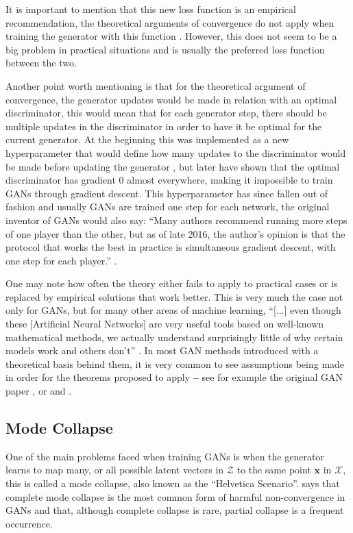 It is important to mention that this new loss function is an empirical recommendation, the theoretical arguments of convergence do not apply when training the generator with this function \cite{gans2014}. However, this does not seem to be a big problem in practical situations and is usually the preferred loss function between the two.

Another point worth mentioning is that for the theoretical argument of convergence, the generator updates would be made in relation with an optimal discriminator, this would mean that for each generator step, there should be multiple updates in the discriminator in order to have it be optimal for the current generator. At the beginning this was implemented as a new hyperparameter that would define how many updates to the discriminator would be made before updating the generator \cite{gans2014}, but later \textcite{principled_gan_methods2017} have shown that the optimal discriminator has gradient $0$ almost everywhere, making it impossible to train \acp{GAN} through gradient descent. This hyperparameter has since fallen out of fashion and usually \acp{GAN} are trained one step for each network, the original inventor of \acp{GAN} would also say: ``Many authors recommend running more steps of one player than the other, but as of late 2016, the author’s opinion is that the protocol that works the best in practice is simultaneous gradient descent, with one step for each player.'' \cite{nipsGAN2017}.

One may note how often the theory either fails to apply to practical cases or is replaced by empirical solutions that work better. This is very much the case not only for \acp{GAN}, but for many other areas of machine learning, ``[...] even though these [Artificial Neural Networks] are very useful tools based on well-known mathematical methods, we actually understand surprisingly little of why certain models work and others don’t'' \cite{visualizingFeatures2015}. In most \gls{GAN} methods introduced with a theoretical basis behind them, it is very common to see assumptions being made in order for the theorems proposed to apply \textbf{--} see for example the original \gls{GAN} paper \cite{gans2014}, or \cite{wasserstein2017} and \cite{TTUR_FID2017}.

\subsection{Mode Collapse}
One of the main problems faced when training \acp{GAN} is when the generator learns to map many, or all possible latent vectors in $\mathcal{Z}$ to the same point $\bm{x}$ in $\mathcal{X}$, this is called a mode collapse, also known as the ``Helvetica Scenario''. \textcite{nipsGAN2017} says that complete mode collapse is the most common form of harmful non-convergence in GANs and that, although complete collapse is rare, partial collapse is a frequent occurrence.


